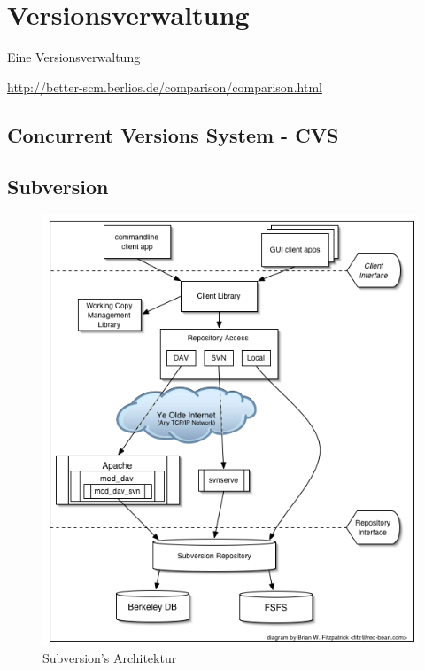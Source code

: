 \section{Versionsverwaltung} \label{sec:tech-Versionsverwaltung}
Eine Versionsverwaltung 


\url{http://better-scm.berlios.de/comparison/comparison.html}
\citep[Versionsverwaltung]{Wikipedia2005}

\subsection{Concurrent Versions System - CVS}
		
		
\subsection{Subversion}

\begin{figure}[htbp]
	\centering
	\includegraphics[scale=0.65]{images/subversion-architektur.png}
	\caption{Subversion's Architektur \citep[Kap.~1]{Collins-Sussman2005}}
	\label{fig:svnarchitekur}
\end{figure}


